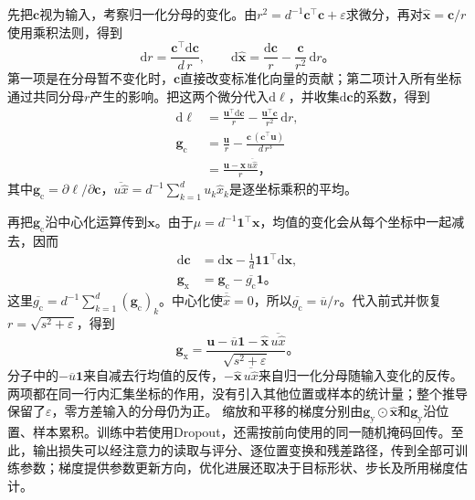 先把$\bm c$视为输入，考察归一化分母的变化。由$r^2=d^{-1}\bm c^{\top}\bm c+\varepsilon$求微分，再对$\widehat{\bm x}=\bm c/r$使用乘积法则，得到
\[
  \mathrm d r=\frac{\bm c^{\top}\mathrm d\bm c}{d\,r},\qquad
  \mathrm d\widehat{\bm x}
    =\frac{\mathrm d\bm c}{r}
       -\frac{\bm c}{r^2}\,\mathrm d r\text{。}
\]
第一项是在分母暂不变化时，$\bm c$直接改变标准化向量的贡献；第二项计入所有坐标通过共同分母$r$产生的影响。把这两个微分代入$\mathrm d\ell$，并收集$\mathrm d\bm c$的系数，得到
\[
  \begin{aligned}
    \mathrm d\ell
      &=\frac{\bm u^{\top}\mathrm d\bm c}{r}
          -\frac{\bm u^{\top}\bm c}{r^2}\,\mathrm d r,\\
    \bm g_{\mathrm c}
      &=\frac{\bm u}{r}
          -\frac{\bm c\,(\bm c^{\top}\bm u)}{d\,r^3}\\
      &=\frac{\bm u-\widehat{\bm x}\,\overline{u\widehat x}}{r}\text{，}
  \end{aligned}
\]
其中$\bm g_{\mathrm c}=\partial\ell/\partial\bm c$，$\overline{u\widehat x}=d^{-1}\sum_{k=1}^d u_k\widehat x_k$是逐坐标乘积的平均。

再把$\bm g_{\mathrm c}$沿中心化运算传到$\bm x$。由于$\mu=d^{-1}\bm1^{\top}\bm x$，均值的变化会从每个坐标中一起减去，因而
\[
  \begin{aligned}
    \mathrm d\bm c
      &=\mathrm d\bm x-\frac1d\bm1\bm1^{\top}\mathrm d\bm x,\\
    \bm g_{\mathrm x}
      &=\bm g_{\mathrm c}-\overline{g_{\mathrm c}}\bm1\text{。}
  \end{aligned}
\]
这里$\overline{g_{\mathrm c}}=d^{-1}\sum_{k=1}^d(\bm g_{\mathrm c})_k$。中心化使$\overline{\widehat x}=0$，所以$\overline{g_{\mathrm c}}=\overline u/r$。代入前式并恢复$r=\sqrt{s^2+\varepsilon}$，得到
\begin{equation}
  \bm g_{\mathrm x}
   =\frac{\bm u-\overline u\bm1
             -\widehat{\bm x}\,\overline{u\widehat x}}
          {\sqrt{s^2+\varepsilon}}\text{。}
  \label{eq:transformer-layernorm-gradient}
\end{equation}
分子中的$-\overline u\bm1$来自减去行均值的反传，$-\widehat{\bm x}\,\overline{u\widehat x}$来自归一化分母随输入变化的反传。两项都在同一行内汇集坐标的作用，没有引入其他位置或样本的统计量；整个推导保留了$\varepsilon$，零方差输入的分母仍为正。
缩放和平移的梯度分别由$\bm g_{\mathrm y}\odot\widehat{\bm x}$和$\bm g_{\mathrm y}$沿位置、样本累积。训练中若使用Dropout，还需按前向使用的同一随机掩码回传。至此，输出损失可以经注意力的读取与评分、逐位置变换和残差路径，传到全部可训练参数；梯度提供参数更新方向，优化进展还取决于目标形状、步长及所用梯度估计。

